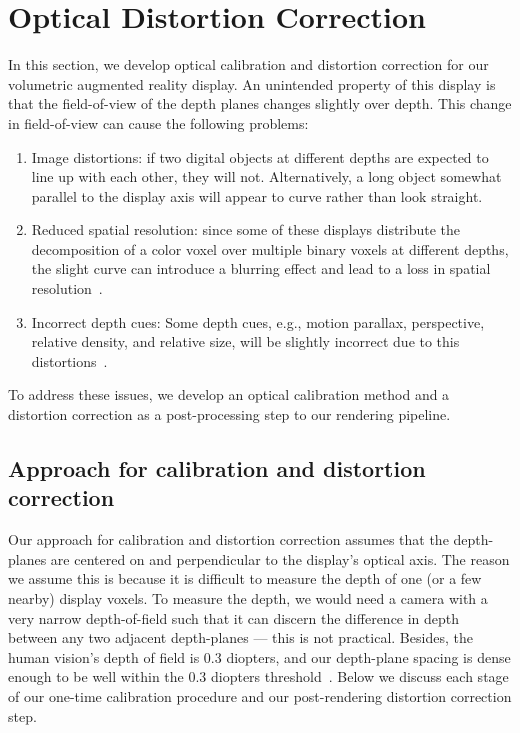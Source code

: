 \section{Optical Distortion Correction}
In this section, we develop optical calibration and distortion correction for our volumetric augmented reality display. An unintended property of this display is that the field-of-view of the depth planes changes slightly over depth. This change in field-of-view can cause the following problems:

\begin{enumerate}
    \item Image distortions: if two digital objects at different depths are expected to line up with each other, they will not. Alternatively, a long object somewhat parallel to the display axis will appear to curve rather than look straight.
    \item Reduced spatial resolution: since some of these displays distribute the decomposition of a color voxel over multiple binary voxels at different depths, the slight curve can introduce a blurring effect and lead to a loss in spatial resolution~\cite{Rathinavel2018}. 
    \item Incorrect depth cues: Some depth cues, e.g., motion parallax, perspective, relative density, and relative size, will be slightly incorrect due to this distortions~\cite{cutting1995perceiving}.
\end{enumerate}

To address these issues, we develop an optical calibration method and a distortion correction as a post-processing step to our rendering pipeline. 

\subsection{Approach for calibration and distortion correction}

Our approach for calibration and distortion correction assumes that the depth-planes are centered on and perpendicular to the display's optical axis. 
The reason we assume this is because it is difficult to measure the depth of one (or a few nearby) display voxels. 
To measure the depth, we would need a camera with a very narrow depth-of-field such that it can discern the difference in depth between any two adjacent depth-planes --- this is not practical. 
Besides, the human vision's depth of field is 0.3 diopters, and our depth-plane spacing is dense enough to be well within the 0.3 diopters threshold~\cite{Rathinavel2018}. Below we discuss each stage of our one-time calibration procedure and our post-rendering distortion correction step.

